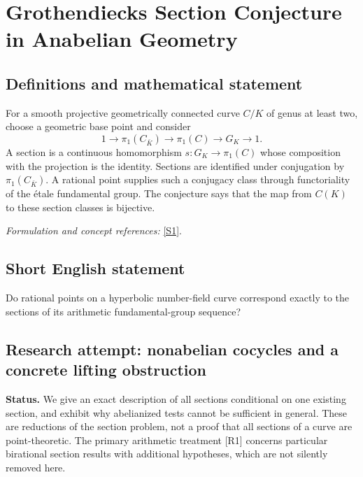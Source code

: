 \documentclass[11pt]{article}
\begin{document}
\section*{\texorpdfstring{Grothendiecks Section Conjecture in Anabelian Geometry}{Grothendiecks Section Conjecture in Anabelian Geometry}}\label{statement}
\subsection{Definitions and mathematical statement}
For a smooth projective geometrically connected curve $C/K$ of genus at least two, choose a geometric base point and consider
\[
 1\longrightarrow\pi_1(C_{\bar K})\longrightarrow\pi_1(C)
 \longrightarrow G_K\longrightarrow1.
\]
A section is a continuous homomorphism $s:G_K\to\pi_1(C)$ whose composition with the projection is the identity. Sections are identified under conjugation by $\pi_1(C_{\bar K})$. A rational point supplies such a conjugacy class through functoriality of the étale fundamental group. The conjecture says that the map from $C(K)$ to these section classes is bijective.
\par\smallskip\textit{Formulation and concept references:} \href{https://doi.org/10.1017/CBO9780511758874.005}{[S1]}.

\subsection{Short English statement}
Do rational points on a hyperbolic number-field curve correspond exactly to the sections of its arithmetic fundamental-group sequence?
\subsection{Research attempt: nonabelian cocycles and a concrete lifting obstruction}
\textbf{Status.} We give an exact description of all sections conditional on one existing section, and exhibit why abelianized tests cannot be sufficient in general. These are reductions of the section problem, not a proof that all sections of a curve are point-theoretic. The primary arithmetic treatment [R1] concerns particular birational section results with additional hypotheses, which are not silently removed here.
\end{document}
